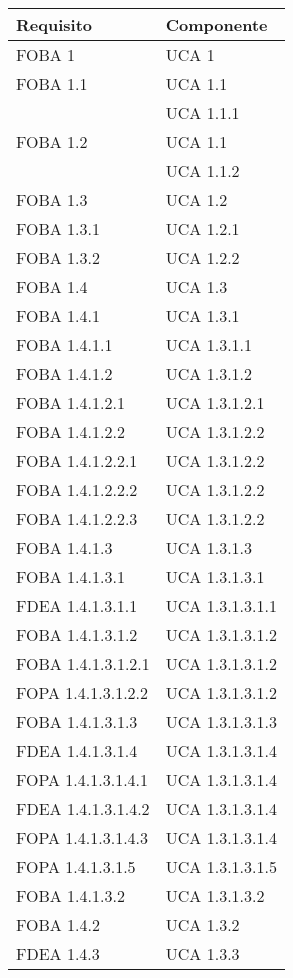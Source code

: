 \begin{longtable}{XX}
\toprule
\textbf{Requisito} & \textbf{Componente}\\
\midrule
FOBA 1&UCA 1\\
\midrule
FOBA 1.1&UCA 1.1\\
&UCA 1.1.1\\
\midrule
FOBA 1.2&UCA 1.1\\
&UCA 1.1.2\\
\midrule
FOBA 1.3&UCA 1.2\\
\midrule
FOBA 1.3.1&UCA 1.2.1\\
\midrule
FOBA 1.3.2&UCA 1.2.2\\
\midrule
FOBA 1.4&UCA 1.3\\
\midrule
FOBA 1.4.1&UCA 1.3.1\\
\midrule
FOBA 1.4.1.1&UCA 1.3.1.1\\
\midrule
FOBA 1.4.1.2&UCA 1.3.1.2\\
\midrule
FOBA 1.4.1.2.1&UCA 1.3.1.2.1\\
\midrule
FOBA 1.4.1.2.2&UCA 1.3.1.2.2\\
\midrule
FOBA 1.4.1.2.2.1&UCA 1.3.1.2.2\\
\midrule
FOBA 1.4.1.2.2.2&UCA 1.3.1.2.2\\
\midrule
FOBA 1.4.1.2.2.3&UCA 1.3.1.2.2\\
\midrule
FOBA 1.4.1.3&UCA 1.3.1.3\\
\midrule
FOBA 1.4.1.3.1&UCA 1.3.1.3.1\\
\midrule
FDEA 1.4.1.3.1.1&UCA 1.3.1.3.1.1\\
\midrule
FOBA 1.4.1.3.1.2&UCA 1.3.1.3.1.2\\
\midrule
FOBA 1.4.1.3.1.2.1&UCA 1.3.1.3.1.2\\
\midrule
FOPA 1.4.1.3.1.2.2&UCA 1.3.1.3.1.2\\
\midrule
FOBA 1.4.1.3.1.3&UCA 1.3.1.3.1.3\\
\midrule
FDEA 1.4.1.3.1.4&UCA 1.3.1.3.1.4\\
\midrule
FOPA 1.4.1.3.1.4.1&UCA 1.3.1.3.1.4\\
\midrule
FDEA 1.4.1.3.1.4.2&UCA 1.3.1.3.1.4\\
\midrule
FOPA 1.4.1.3.1.4.3&UCA 1.3.1.3.1.4\\
\midrule
FOPA 1.4.1.3.1.5&UCA 1.3.1.3.1.5\\
\midrule
FOBA 1.4.1.3.2&UCA 1.3.1.3.2\\
\midrule
FOBA 1.4.2&UCA 1.3.2\\
\midrule
FDEA 1.4.3&UCA 1.3.3\\

\end{longtable}
